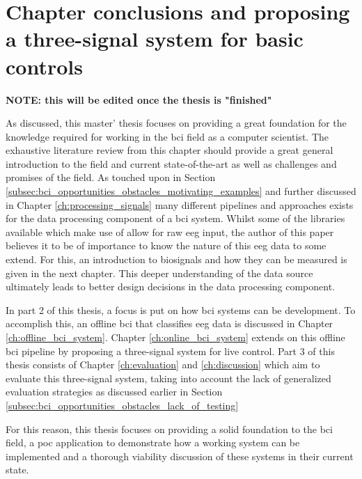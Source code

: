 
\lipsum[1]


\section{Chapter conclusions and proposing a three-signal system for basic controls}
\label{sec:bci_concolusion_and_proposing_ours}



\textbf{NOTE: this will be edited once the thesis is "finished"}

As discussed, this master' thesis focuses on providing a great foundation for the knowledge required for working in the \gls{bci} field as a computer scientist.
The exhaustive literature review from this chapter should provide a great general introduction to the field and current state-of-the-art as well as challenges and promises of the field.
As touched upon in Section \ref{subsec:bci_opportunities_obstacles_motivating_examples} and further discussed in Chapter \ref{ch:processing_signals} many different pipelines and approaches exists for the data processing component of a \gls{bci} system.
Whilst some of the libraries available which make use of  allow for raw \gls{eeg} input, the author of this paper believes it to be of importance to know the nature of this \gls{eeg} data to some extend.
For this, an introduction to \glspl{biosignal} and how they can be measured is given in the next chapter.
This deeper understanding of the data source ultimately leads to better design decisions in the data processing component.

In part 2 of this thesis, a focus is put on how \gls{bci} systems can be development.
To accomplish this, an offline \gls{bci} that classifies \gls{eeg} data is discussed in Chapter \ref{ch:offline_bci_system}.
Chapter \ref{ch:online_bci_system} extends on this offline \gls{bci} pipeline by proposing a three-signal system for live control.
Part 3 of this thesis consists of Chapter \ref{ch:evaluation} and \ref{ch:discussion} which aim to evaluate this three-signal system, taking into account the lack of generalized evaluation strategies as discussed earlier in Section \ref{subsec:bci_opportunities_obstacles_lack_of_testing}

For this reason, this thesis focuses on providing a solid foundation to the \gls{bci} field, a \gls{poc} application to demonstrate how a working system can be implemented and a thorough viability discussion of these systems in their current state.